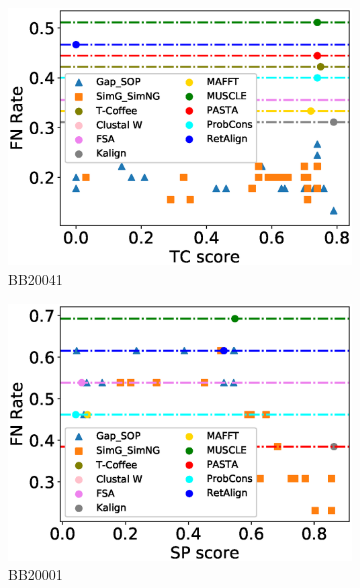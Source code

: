 \begin{figure}[!htbp]
\begin{adjustwidth}{-1.5cm}{-1cm}
\begin{subfigure}{0.22\textwidth}
			\includegraphics[width=\columnwidth]{Figure/summary/precomputedInit/Balibase/BB20041_fnrate_vs_tc_2}
			\caption{BB20041}
		\end{subfigure}
		\begin{subfigure}{0.22\textwidth}
			\includegraphics[width=\columnwidth]{Figure/summary/precomputedInit/Balibase/BB20001_fnrate_vs_sp_2}
			\caption{BB20001}
		\end{subfigure}	
		\begin{subfigure}{0.22\textwidth}

\end{subfigure}
\end{adjustwidth}
\end{figure}
